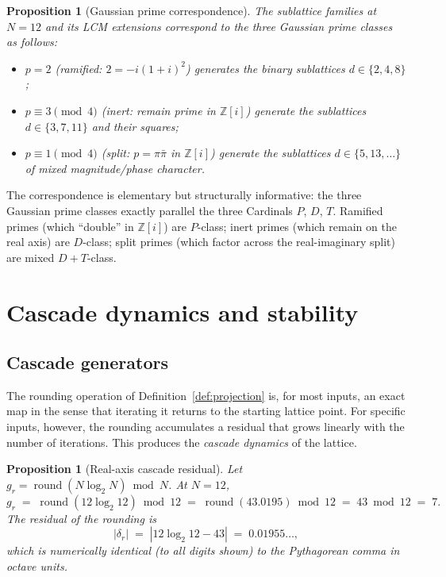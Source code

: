 \documentclass[11pt,a4paper]{article}
\newtheorem{proposition}[theorem]{Proposition}
\theoremstyle{definition}
\theoremstyle{remark}
\newcommand{\Z}{\mathbb{Z}}
\DeclareMathOperator{\round}{round}
\begin{document}
\begin{proposition}[Gaussian prime correspondence]\label{prop:gaussian}
The sublattice families at $N=12$ and its LCM extensions correspond to the three Gaussian prime classes as follows:
\begin{itemize}[leftmargin=*]
\item $p=2$ (ramified: $2=-i(1+i)^{2}$) generates the binary sublattices $d\in\{2,4,8\}$;
\item $p\equiv 3\pmod 4$ (inert: remain prime in $\Z[i]$) generate the sublattices $d\in\{3,7,11\}$ and their squares;
\item $p\equiv 1\pmod 4$ (split: $p=\pi\bar\pi$ in $\Z[i]$) generate the sublattices $d\in\{5,13,\ldots\}$ of mixed magnitude/phase character.
\end{itemize}
\end{proposition}

The correspondence is elementary but structurally informative: the three Gaussian prime classes exactly parallel the three Cardinals $P$, $D$, $T$. Ramified primes (which ``double'' in $\Z[i]$) are $P$-class; inert primes (which remain on the real axis) are $D$-class; split primes (which factor across the real-imaginary split) are mixed $D{+}T$-class.

\section{Cascade dynamics and stability}\label{sec:cascade}

\subsection{Cascade generators}

The rounding operation of Definition~\ref{def:projection} is, for most inputs, an exact map in the sense that iterating it returns to the starting lattice point. For specific inputs, however, the rounding accumulates a residual that grows linearly with the number of iterations. This produces the \emph{cascade dynamics} of the lattice.

\begin{proposition}[Real-axis cascade residual]\label{prop:cascader}
Let $g_{r} = \round(N\log_{2}N)\bmod N$. At $N=12$,
\[
g_{r} \;=\; \round(12\log_{2}12)\bmod 12 \;=\; \round(43.0195)\bmod 12 \;=\; 43\bmod 12 \;=\; 7.
\]
The residual of the rounding is
\[
|\delta_{r}| \;=\; |12\log_{2}12 - 43| \;=\; 0.01955\ldots,
\]
which is numerically identical (to all digits shown) to the Pythagorean comma in octave units.
\end{proposition}
\end{document}
